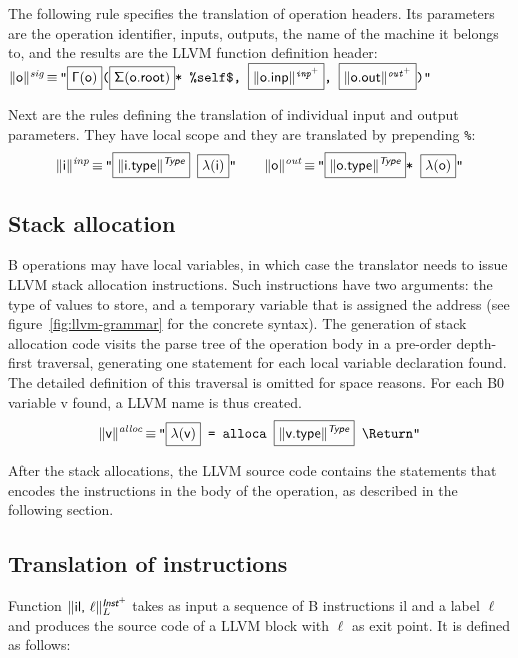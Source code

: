 \documentclass{llncs}
\newcommand{\trad}[2]{\ensuremath{\lVert \textsf{#1} \rVert^{\textit{#2}}}}
\newcommand{\nl}[0]{\text{\Return}}
\DeclareMathOperator{\isdef}{\equiv}
\newcommand{\llvm}[1]{\texttt{#1}}
\newcommand{\B}[1]{\textsf{#1}}
\newcommand{\ListOf}[1]{$\mbox{#1}^+$}
\newcommand{\PH}[1]{\framebox{$#1$}}
\newcommand{\Global}[0]{\ensuremath{\sf\Gamma}}
\newcommand{\local}[0]{\ensuremath{\sf\lambda}}
\newcommand{\state}[0]{\ensuremath{\sf\Sigma}}
\begin{document}
The following rule specifies the translation of operation headers. Its
parameters are the operation identifier, inputs, outputs, the name of the
machine it belongs to, and the results are the LLVM function definition
header: \\
\noindent$\trad{\B{o}}{sig} \isdef \llvm{"\PH{\Global(\B{o})}(\PH{\state(\B{o.root})}* \%self\$, \PH{\trad{\B{o.inp}}{\ListOf{inp}}}, \PH{\trad{\B{o.out}}{\ListOf{out}}})"}$

Next are the rules defining the translation of individual input and output
parameters. They have local scope and they are translated by prepending
\llvm{\%}:
\begin{align*}
  \trad{i}{inp} \isdef 
  \llvm{"\PH{\trad{i.type}{\B{Type}}} \PH{\local(\B{i})}"} \quad \quad
  \trad{o}{out} \isdef 
  \llvm{"\PH{\trad{o.type}{\B{Type}}}* \PH{\local(\B{o})}"}
\end{align*}

\subsection{Stack allocation}
\label{sec:trad-alloc}

B operations may have local variables, in which case the translator needs to
issue LLVM stack allocation instructions. Such instructions have two arguments:
the type of values to store, and a temporary variable that is assigned the
address (see figure~\ref{fig:llvm-grammar} for the concrete syntax). The
generation of stack allocation code visits the parse tree of the operation body
in a pre-order depth-first traversal, generating one statement for each local
variable declaration found. The detailed definition of this traversal is omitted
for space reasons. For each B0 variable \B{v} found, a LLVM name is thus
created.
\begin{align*}
  \trad{v}{alloc} \isdef 
  \llvm{"\PH{\local(\B{v})} = alloca \PH{\trad{v.type}{\B{Type}}} \nl"}
\end{align*}

After the stack allocations, the LLVM source code contains the statements that
encodes the instructions in the body of the operation, as described in the
following section.

\subsection{Translation of instructions}
\label{sec:trad-instr}

Function $\trad{\B{il}, $\ell$}{\ListOf{\B{Inst}}}_L$ takes as input a sequence
of B instructions \B{il} and a label $\ell$ and produces the source code of a
LLVM block with $\ell$ as exit point. It is defined as follows:
\end{document}
